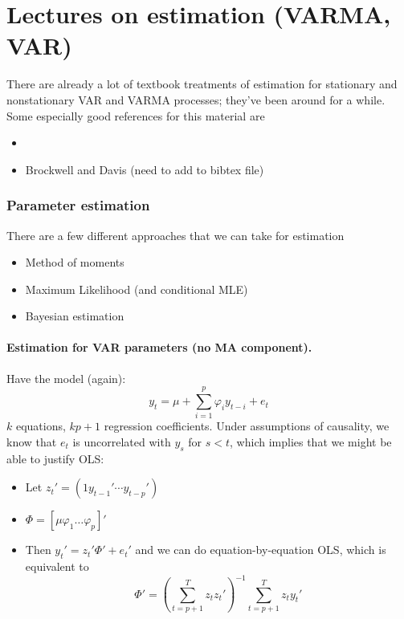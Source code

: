 

\part*{Lectures on estimation (VARMA, VAR)}

There are already a lot of textbook treatments of estimation for
stationary and nonstationary VAR and VARMA processes; they've been
around for a while.  Some especially good references for this material
are
\begin{itemize}
\item \citet{Ham_1994}
\item Brockwell and Davis (need to add to bibtex file)
\end{itemize}

\section{Parameter estimation}

There are a few different approaches that we can take for estimation
\begin{itemize}
\item Method of moments
\item Maximum Likelihood (and conditional MLE)
\item Bayesian estimation
\end{itemize}

\subsection{Estimation for VAR parameters (no MA component).}

Have the model (again):
\[y_t = μ + ∑_{i=1}^p φ_i y_{t-i} + e_t\] $k$ equations, $k p + 1$
regression coefficients. Under assumptions of causality, we know that
$e_t$ is uncorrelated with $y_s$ for $s < t$, which implies that we
might be able to justify OLS:
\begin{itemize}
\item Let $z_t' = (1 y_{t-1}' ⋯ y_{t-p}')$
\item $Φ = [ μ φ_1 … φ_p ]'$
\item Then $y_t' = z_t'Φ' + e_t'$ and we can do equation-by-equation
  OLS, which is equivalent to
  \[\hat Φ' = (∑_{t=p+1}^T z_t z_t')^{-1} ∑_{t=p+1}^T z_t y_t'\]
\end{itemize}

